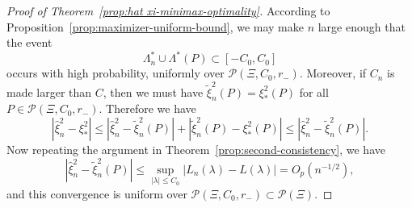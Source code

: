 \documentclass{article}
\theoremstyle{definition}
\newcommand{\1}{\mathbbm{1}}
\begin{document}
\begin{proof}[Proof of Theorem~\ref{prop:hat xi-minimax-optimality}]
    According to Proposition~\ref{prop:maximizer-uniform-bound}, we may make $n$ large enough that the event 
    \[
    \Lambda^*_n \cup \Lambda^*(P) \subset [-C_0, C_0]
    \]
    occurs with high probability, uniformly over $\mathcal P(\Xi, C_0, r_-)$. Moreover, if $C_n$ is made larger than $C$, then we must have $\tilde \xi_n^2(P) = \xi^2_*(P)$ for all $P \in \mathcal P(\Xi, C_0, r_-)$. Therefore we have
    \[
    |\hat \xi_n^2 - \xi_*^2| \leq |\hat \xi^2_n - \tilde \xi^2_n(P)| + |\tilde \xi^2_n(P) - \xi_*^2(P)| \leq |\hat \xi^2_n - \tilde \xi^2_n(P)|.
    \]
    Now repeating the argument in Theorem~\ref{prop:second-consistency}, we have 
    \[
    |\hat \xi^2_n - \tilde \xi^2_n(P)| \leq \sup_{|\lambda| \leq C_0} |L_n(\lambda) - L(\lambda)| = O_p(n^{-1/2}),
    \]
    and this convergence is uniform over $\mathcal P(\Xi, C_0, r_-) \subset \mathcal P(\Xi)$. 
\end{proof}
\end{document}
